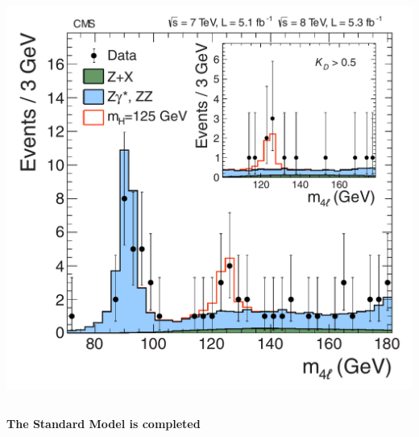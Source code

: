 \documentclass{beamer}
\begin{document}
\begin{frame}
\begin{columns}
\begin{column}{0.51\textwidth}
      \includegraphics[width=\textwidth]{figures/fig4.pdf}\\
    \end{column}
  \end{columns}
  \begin{block}{}
    \centering
    \textbf{The Standard Model is completed \checkmark}
  \end{block}
\end{frame}
\end{document}
